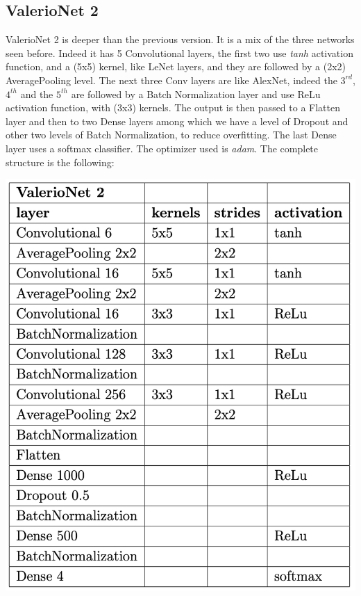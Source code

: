 \documentclass[12pt]{article}
\begin{document}
\subsection{ValerioNet 2}
ValerioNet 2 is deeper than the previous version. It is a mix of the three networks seen before. Indeed it has 5 Convolutional layers, the first two use {\em tanh} activation function, and a (5x5) kernel, like LeNet layers, and they are followed by a (2x2) AveragePooling level. The next three Conv layers are like AlexNet, indeed the $3^{rd}$, $4^{th}$ and the $5^{th}$ are followed by a Batch Normalization layer and use ReLu activation function, with (3x3) kernels. The output is then passed to a Flatten layer and then to two Dense layers among which we have a level of Dropout and other two levels of Batch Normalization, to reduce overfitting. The last Dense layer uses a softmax classifier. The optimizer used is {\em adam}. The complete structure is the following:

\bigskip
\begin{minipage}[c]{.5\textwidth}
 \centering
 \includegraphics[width=\textwidth]{pic3}
\end{minipage}
\bigskip
\end{document}

